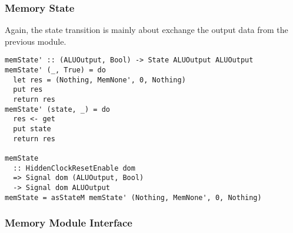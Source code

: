 \subsubsection{Memory State}
Again, the state transition is mainly about exchange the output data from the previous module.
\begin{verbatim}
memState' :: (ALUOutput, Bool) -> State ALUOutput ALUOutput
memState' (_, True) = do
  let res = (Nothing, MemNone', 0, Nothing)
  put res
  return res
memState' (state, _) = do
  res <- get
  put state
  return res

memState 
  :: HiddenClockResetEnable dom
  => Signal dom (ALUOutput, Bool)
  -> Signal dom ALUOutput
memState = asStateM memState' (Nothing, MemNone', 0, Nothing)
\end{verbatim}
\subsubsection{Memory Module Interface}
